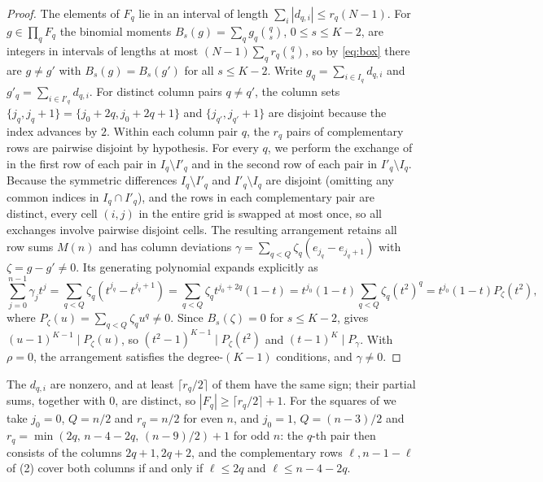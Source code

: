 \begin{proof}
The elements of $F_q$ lie in an interval of length $\sum_i|d_{q,i}|\le r_q(N-1)$.
For $g\in\prod_qF_q$ the binomial moments $B_s(g)=\sum_qg_q\binom qs$, $0\le s\le K-2$, are integers in intervals of lengths at most $(N-1)\sum_qr_q\binom qs$, so by \eqref{eq:box} there are $g\ne g'$ with $B_s(g)=B_s(g')$ for all $s\le K-2$.
Write $g_q=\sum_{i\in I_q}d_{q,i}$ and $g'_q=\sum_{i\in I'_q}d_{q,i}$.
For distinct column pairs $q\ne q'$, the column sets $\{j_q, j_q+1\}=\{j_0+2q, j_0+2q+1\}$ and $\{j_{q'}, j_{q'}+1\}$ are disjoint because the index advances by $2$.
Within each column pair $q$, the $r_q$ pairs of complementary rows are pairwise disjoint by hypothesis.
For every $q$, we perform the exchange of  in the first row of each pair in $I_q\setminus I'_q$ and in the second row of each pair in $I'_q\setminus I_q$.
Because the symmetric differences $I_q\setminus I'_q$ and $I'_q\setminus I_q$ are disjoint (omitting any common indices in $I_q\cap I'_q$), and the rows in each complementary pair are distinct, every cell $(i,j)$ in the entire grid is swapped at most once, so all exchanges involve pairwise disjoint cells.
The resulting arrangement retains all row sums $M(n)$ and has column deviations $\gamma=\sum_{q<Q}\zeta_q(e_{j_q}-e_{j_q+1})$ with $\zeta=g-g'\ne0$.
Its generating polynomial expands explicitly as
\begin{equation}
\sum_{j=0}^{n-1}\gamma_jt^j=\sum_{q<Q}\zeta_q(t^{j_q}-t^{j_q+1})=\sum_{q<Q}\zeta_qt^{j_0+2q}(1-t)=t^{j_0}(1-t)\sum_{q<Q}\zeta_q(t^2)^q=t^{j_0}(1-t)P_\zeta(t^2),
\label{eq:box_poly_step}
\end{equation}
where $P_\zeta(u)=\sum_{q<Q}\zeta_qu^q\ne0$.
Since $B_s(\zeta)=0$ for $s\le K-2$,  gives $(u-1)^{K-1}\mid P_\zeta(u)$, so $(t^2-1)^{K-1}\mid P_\zeta(t^2)$ and $(t-1)^{K}\mid P_\gamma$.
With $\rho=0$, the arrangement satisfies the degree-$(K-1)$ conditions, and $\gamma\ne0$.
\end{proof}

The $d_{q,i}$ are nonzero, and at least $\lceil r_q/2\rceil$ of them have the same sign; their partial sums, together with $0$, are distinct, so $|F_q|\ge\lceil r_q/2\rceil+1$.
For the squares of  we take $j_0=0$, $Q=n/2$ and $r_q=n/2$ for even $n$, and $j_0=1$, $Q=(n-3)/2$ and $r_q=\min(2q,\,n-4-2q,\,(n-9)/2)+1$ for odd $n$: the $q$-th pair then consists of the columns $2q+1,2q+2$, and the complementary rows $\ell,n-1-\ell$ of (2) cover both columns if and only if $\ell\le2q$ and $\ell\le n-4-2q$.

